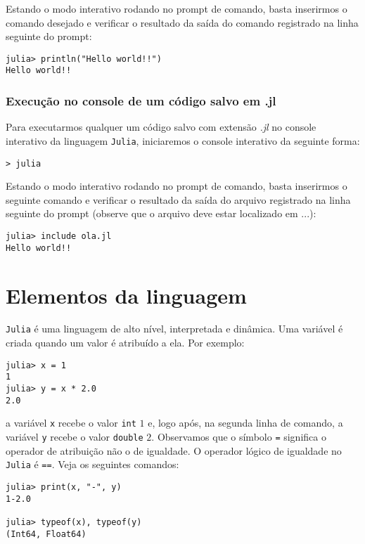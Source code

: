 Estando o modo interativo rodando no prompt de comando, basta inserirmos o comando desejado e verificar o resultado da saída do comando registrado na linha seguinte do prompt:

\begin{lstlisting}
julia> println("Hello world!!")
Hello world!!
\end{lstlisting}

\subsubsection{Execução no console de um código salvo em .jl}

Para executarmos qualquer um código salvo com extensão \emph{.jl} no console interativo da linguagem \verb+Julia+, iniciaremos o console interativo da seguinte forma:

\begin{lstlisting}[style=c]
> julia
\end{lstlisting}

Estando o modo interativo rodando no prompt de comando, basta inserirmos o seguinte comando e verificar o resultado da saída do arquivo registrado na linha seguinte do prompt (observe que o arquivo deve estar localizado em ...):

\begin{lstlisting}
julia> include ola.jl
Hello world!!
\end{lstlisting}

\section{Elementos da linguagem}

\verb+Julia+ é uma linguagem de alto nível, interpretada e dinâmica. Uma variável é criada quando um valor é atribuído a ela. Por exemplo:

\begin{lstlisting}
julia> x = 1
1
julia> y = x * 2.0
2.0
\end{lstlisting}

a variável \verb+x+ recebe o valor \verb+int+ $1$ e, logo após, na segunda linha de comando, a variável \verb+y+ recebe o valor \verb+double+ $2$. Observamos que o símbolo \verb+=+ significa o operador de atribuição não o de igualdade. O operador lógico de igualdade no \verb+Julia+ é \verb+==+. Veja os seguintes comandos:

\begin{lstlisting}
julia> print(x, "-", y)
1-2.0

julia> typeof(x), typeof(y)
(Int64, Float64)
\end{lstlisting}

